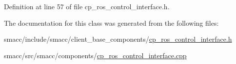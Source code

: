 Definition at line 57 of file cp\+\_\+ros\+\_\+control\+\_\+interface.\+h.



The documentation for this class was generated from the following files\+:\begin{DoxyCompactItemize}
\item 
smacc/include/smacc/client\+\_\+base\+\_\+components/\hyperlink{cp__ros__control__interface_8h}{cp\+\_\+ros\+\_\+control\+\_\+interface.\+h}\item 
smacc/src/smacc/components/\hyperlink{cp__ros__control__interface_8cpp}{cp\+\_\+ros\+\_\+control\+\_\+interface.\+cpp}\end{DoxyCompactItemize}
